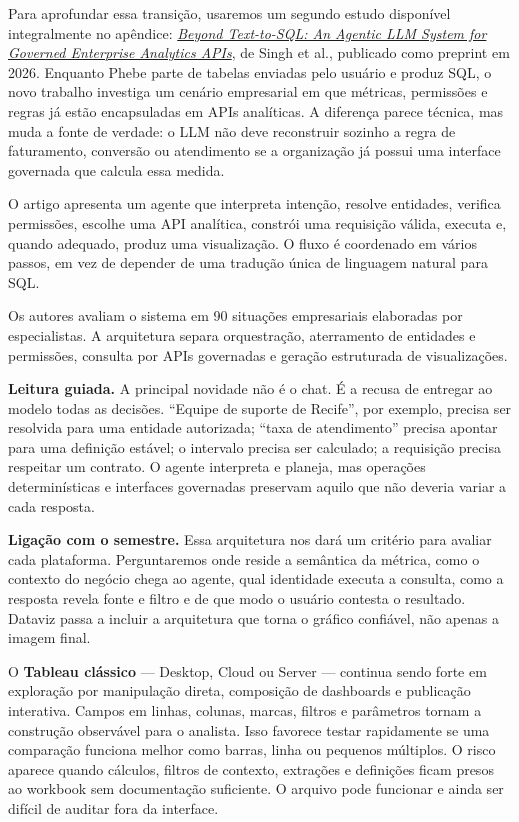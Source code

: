 Para aprofundar essa transição, usaremos um segundo estudo disponível integralmente no apêndice: \href{https://arxiv.org/abs/2605.21027}{\textit{Beyond Text-to-SQL: An Agentic LLM System for Governed Enterprise Analytics APIs}}, de Singh et al., publicado como preprint em 2026. Enquanto Phebe parte de tabelas enviadas pelo usuário e produz SQL, o novo trabalho investiga um cenário empresarial em que métricas, permissões e regras já estão encapsuladas em APIs analíticas. A diferença parece técnica, mas muda a fonte de verdade: o LLM não deve reconstruir sozinho a regra de faturamento, conversão ou atendimento se a organização já possui uma interface governada que calcula essa medida.

\begin{ArticleBox}
O artigo apresenta um agente que interpreta intenção, resolve entidades, verifica permissões, escolhe uma API analítica, constrói uma requisição válida, executa e, quando adequado, produz uma visualização. O fluxo é coordenado em vários passos, em vez de depender de uma tradução única de linguagem natural para SQL.

Os autores avaliam o sistema em 90 situações empresariais elaboradas por especialistas. A arquitetura separa orquestração, aterramento de entidades e permissões, consulta por APIs governadas e geração estruturada de visualizações.
\end{ArticleBox}

\noindent\textbf{Leitura guiada.} A principal novidade não é o chat. É a recusa de entregar ao modelo todas as decisões. ``Equipe de suporte de Recife'', por exemplo, precisa ser resolvida para uma entidade autorizada; ``taxa de atendimento'' precisa apontar para uma definição estável; o intervalo precisa ser calculado; a requisição precisa respeitar um contrato. O agente interpreta e planeja, mas operações determinísticas e interfaces governadas preservam aquilo que não deveria variar a cada resposta.

\noindent\textbf{Ligação com o semestre.} Essa arquitetura nos dará um critério para avaliar cada plataforma. Perguntaremos onde reside a semântica da métrica, como o contexto do negócio chega ao agente, qual identidade executa a consulta, como a resposta revela fonte e filtro e de que modo o usuário contesta o resultado. Dataviz passa a incluir a arquitetura que torna o gráfico confiável, não apenas a imagem final.

O \textbf{Tableau clássico} --- Desktop, Cloud ou Server --- continua sendo forte em exploração por manipulação direta, composição de dashboards e publicação interativa. Campos em linhas, colunas, marcas, filtros e parâmetros tornam a construção observável para o analista. Isso favorece testar rapidamente se uma comparação funciona melhor como barras, linha ou pequenos múltiplos. O risco aparece quando cálculos, filtros de contexto, extrações e definições ficam presos ao workbook sem documentação suficiente. O arquivo pode funcionar e ainda ser difícil de auditar fora da interface.

